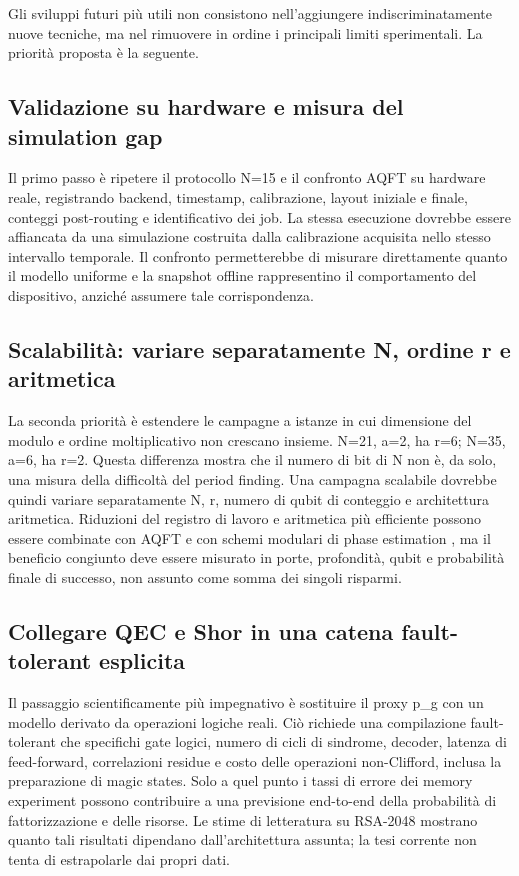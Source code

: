 Gli sviluppi futuri più utili non consistono nell'aggiungere indiscriminatamente nuove tecniche, ma nel rimuovere in ordine i principali limiti sperimentali. La priorità proposta è la seguente.

\subsection{Validazione su hardware e misura del simulation gap}\label{sec:finale_6_4_1}

Il primo passo è ripetere il protocollo N=15 e il confronto AQFT su hardware reale, registrando backend, timestamp, calibrazione, layout iniziale e finale, conteggi post-routing e identificativo dei job. La stessa esecuzione dovrebbe essere affiancata da una simulazione costruita dalla calibrazione acquisita nello stesso intervallo temporale. Il confronto permetterebbe di misurare direttamente quanto il modello uniforme e la snapshot offline rappresentino il comportamento del dispositivo, anziché assumere tale corrispondenza.

\subsection{Scalabilità: variare separatamente N, ordine r e aritmetica}\label{sec:finale_6_4_2}

La seconda priorità è estendere le campagne a istanze in cui dimensione del modulo e ordine moltiplicativo non crescano insieme. N=21, a=2, ha r=6; N=35, a=6, ha r=2. Questa differenza mostra che il numero di bit di N non è, da solo, una misura della difficoltà del period finding. Una campagna scalabile dovrebbe quindi variare separatamente N, r, numero di qubit di conteggio e architettura aritmetica. Riduzioni del registro di lavoro e aritmetica più efficiente \cite{chevignard2025,gidney2021,shukla2026} possono essere combinate con AQFT e con schemi modulari di phase estimation \cite{shuklaqpe2026,shukla2026}, ma il beneficio congiunto deve essere misurato in porte, profondità, qubit e probabilità finale di successo, non assunto come somma dei singoli risparmi.

\subsection{Collegare QEC e Shor in una catena fault-tolerant esplicita}\label{sec:finale_6_4_3}

Il passaggio scientificamente più impegnativo è sostituire il proxy p\_g con un modello derivato da operazioni logiche reali. Ciò richiede una compilazione fault-tolerant che specifichi gate logici, numero di cicli di sindrome, decoder, latenza di feed-forward, correlazioni residue e costo delle operazioni non-Clifford, inclusa la preparazione di magic states. Solo a quel punto i tassi di errore dei memory experiment possono contribuire a una previsione end-to-end della probabilità di fattorizzazione e delle risorse. Le stime di letteratura su RSA-2048 \cite{chevignard2025,gidney2021} mostrano quanto tali risultati dipendano dall'architettura assunta; la tesi corrente non tenta di estrapolarle dai propri dati. \cite{chevignard2025,gidney2021,aharonov1997fault}

